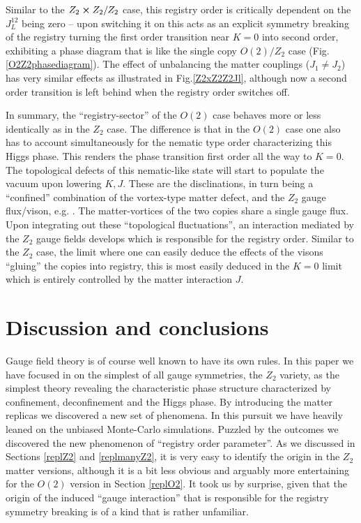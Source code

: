 Similar to the $Z_2\cross Z_2/Z_2$ case, this registry order is critically dependent on the $J_L^{12}$ being zero -- upon switching it on this acts as an explicit symmetry breaking of the registry turning the first order transition near $K=0$ into second order, exhibiting a phase diagram that is like the single  copy $O(2)/Z_2$ case (Fig.\ref{O2Z2phasediagram}). The effect of unbalancing the matter couplings ($J_1 \neq J_2$) has very similar effects as illustrated in Fig.\ref{Z2xZ2Z2Jl}, although now a second order transition is left behind when the registry order switches off.

In summary, the ``registry-sector'' of the $O(2)$ case behaves more or less identically as in the $Z_2$ case. The difference is that in the $O(2)$ case one also has to account simultaneously for the nematic type order characterizing this Higgs phase. This renders the phase transition first order all the way to $K=0$. 
The topological defects of this nematic-like state will start to populate the vacuum upon lowering $K,J$. These are the disclinations, in turn being a ``confined'' combination of the vortex-type matter defect, and the $Z_2$ gauge flux/vison, e.g. \cite{toner95,Senthil}. The matter-vortices of the two copies share a single gauge flux. Upon integrating out these ``topological fluctuations'', an interaction mediated by the $Z_2$ gauge fields develops which is responsible for the registry order.   Similar to the $Z_2$ case, the limit where one can easily deduce the effects of the visons ``gluing'' the copies into registry, this is most easily deduced in the $K=0$ limit which is entirely controlled by the matter interaction $J$.    

\section{Discussion and conclusions}
\label{discussion}

Gauge field theory is of course well known to have its own rules. In this paper we have focused in on the simplest of all gauge symmetries, the $Z_2$ variety, as the simplest theory revealing the characteristic phase structure characterized by confinement, deconfinement and the Higgs phase. By introducing the matter replicas we discovered a new set of phenomena. In this pursuit we have heavily leaned on the unbiased Monte-Carlo simulations. Puzzled by the outcomes we discovered the new phenomenon of ``registry order parameter''. As we discussed in Sections \ref{replZ2} and \ref{replmanyZ2}, it is very easy to identify the origin in the $Z_2$ matter versions, although it is a bit less obvious and arguably more entertaining  for the $O(2)$ version in Section \ref{replO2}. It took us by surprise, given that the origin of the induced ``gauge interaction'' that is responsible for the registry symmetry breaking  is of a kind that is rather unfamiliar.  

